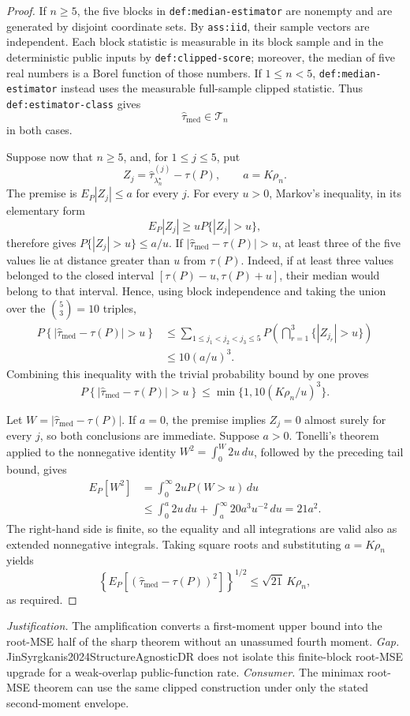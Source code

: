 \documentclass{article}
\begin{document}
\begin{proof}
If \(n\geq 5\), the five blocks in \texttt{def:median-estimator} are nonempty and are generated by disjoint coordinate sets.  By \texttt{ass:iid}, their sample vectors are independent.  Each block statistic is measurable in its block sample and in the deterministic public inputs by \texttt{def:clipped-score}; moreover, the median of five real numbers is a Borel function of those numbers.  If \(1\leq n<5\), \texttt{def:median-estimator} instead uses the measurable full-sample clipped statistic.  Thus \texttt{def:estimator-class} gives
\[
\widehat\tau_{\mathrm{med}}\in\mathcal T_n
\]
in both cases.

Suppose now that \(n\geq5\), and, for \(1\leq j\leq5\), put
\[
Z_j=\widehat\tau_{\lambda_n^{\star}}^{(j)}-\tau(P),
\qquad a=K\rho_n.
\]
The premise is \(E_P|Z_j|\leq a\) for every \(j\).  For every \(u>0\), Markov's inequality, in its elementary form
\[
E_P|Z_j|\geq uP\{|Z_j|>u\},
\]
therefore gives \(P\{|Z_j|>u\}\leq a/u\).  If
\(\left|\widehat\tau_{\mathrm{med}}-\tau(P)\right|>u\), at least three of the five values lie at distance greater than \(u\) from \(\tau(P)\).  Indeed, if at least three values belonged to the closed interval \([\tau(P)-u,\tau(P)+u]\), their median would belong to that interval.  Hence, using block independence and taking the union over the \({5\choose3}=10\) triples,
\[
\begin{split}
P\!\left\{\left|\widehat\tau_{\mathrm{med}}-\tau(P)\right|>u\right\}
&\leq \sum_{1\leq j_1<j_2<j_3\leq5}
P\!\left(\bigcap_{r=1}^3\{|Z_{j_r}|>u\}\right)\\
&\leq 10(a/u)^3.
\end{split}
\]
Combining this inequality with the trivial probability bound by one proves
\[
P\!\left\{\left|\widehat\tau_{\mathrm{med}}-\tau(P)\right|>u\right\}
\leq\min\{1,10(K\rho_n/u)^3\}.
\]

Let \(W=|\widehat\tau_{\mathrm{med}}-\tau(P)|\).  If \(a=0\), the premise implies \(Z_j=0\) almost surely for every \(j\), so both conclusions are immediate.  Suppose \(a>0\).  Tonelli's theorem applied to the nonnegative identity \(W^2=\int_0^W2u\,du\), followed by the preceding tail bound, gives
\[
\begin{split}
E_P\!\left[W^2\right]
&=\int_0^\infty 2uP(W>u)\,du\\
&\leq\int_0^a2u\,du+
\int_a^\infty20a^3u^{-2}\,du
=21a^2.
\end{split}
\]
The right-hand side is finite, so the equality and all integrations are valid also as extended nonnegative integrals.  Taking square roots and substituting \(a=K\rho_n\) yields
\[
\left\{E_P\!\left[(\widehat\tau_{\mathrm{med}}-\tau(P))^2\right]\right\}^{1/2}
\leq\sqrt{21}\,K\rho_n,
\]
as required.
\end{proof}
\par\smallskip\noindent \textit{Justification.} The amplification converts a first-moment upper bound into the root-MSE half of the sharp theorem without an unassumed fourth moment. \textit{Gap.} JinSyrgkanis2024StructureAgnosticDR does not isolate this finite-block root-MSE upgrade for a weak-overlap public-function rate. \textit{Consumer.} The minimax root-MSE theorem can use the same clipped construction under only the stated second-moment envelope.
\end{document}
